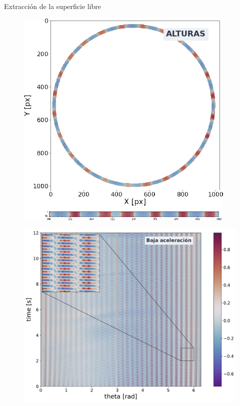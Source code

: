 \documentclass[aspectratio=169]{beamer}
\begin{document}
\begin{frame}{Extracción de la superficie libre}
	\begin{minipage}{0.49\textwidth}
	  \begin{figure}
	    \includegraphics[width=0.8\linewidth]{figs/anillo_a_strip.png}
	  \end{figure}
	\end{minipage} \hfill
	\begin{minipage}{0.49\textwidth}
	  \begin{figure}
	    \includegraphics[width=\linewidth]{figs/st_MED5.pdf}
	  \end{figure}
	\end{minipage}
\end{frame}
\end{document}

